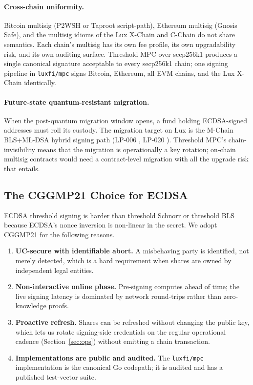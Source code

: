 \paragraph{Cross-chain uniformity.} Bitcoin multisig (P2WSH or
Taproot script-path), Ethereum multisig (Gnosis Safe), and the
multisig idioms of the Lux X-Chain and C-Chain do not share semantics.
Each chain's multisig has its own fee profile, its own upgradability
risk, and its own auditing surface. Threshold MPC over secp256k1
produces a single canonical signature acceptable to every secp256k1
chain; one signing pipeline in \texttt{luxfi/mpc} signs Bitcoin,
Ethereum, all EVM chains, and the Lux X-Chain identically.

\paragraph{Future-state quantum-resistant migration.} When the
post-quantum migration window opens, a fund holding ECDSA-signed
addresses must roll its custody. The migration target on Lux is the
M-Chain BLS+ML-DSA hybrid signing path (LP-006 \cite{lp006},
LP-020 \cite{lp020}). Threshold MPC's chain-invisibility means that
the migration is operationally a key rotation; on-chain multisig
contracts would need a contract-level migration with all the upgrade
risk that entails.

\subsection{The CGGMP21 Choice for ECDSA}

ECDSA threshold signing is harder than threshold Schnorr or
threshold BLS because ECDSA's nonce inversion is non-linear in the
secret. We adopt CGGMP21 \cite{cggmp21} for the following reasons.

\begin{enumerate}[nosep]
\item \textbf{UC-secure with identifiable abort.} A misbehaving
party is identified, not merely detected, which is a hard requirement
when shares are owned by independent legal entities.
\item \textbf{Non-interactive online phase.} Pre-signing computes
ahead of time; the live signing latency is dominated by network
round-trips rather than zero-knowledge proofs.
\item \textbf{Proactive refresh.} Shares can be refreshed without
changing the public key, which lets us rotate signing-side credentials
on the regular operational cadence (Section~\ref{sec:ops}) without
emitting a chain transaction.
\item \textbf{Implementations are public and audited.} The
\texttt{luxfi/mpc} implementation is the canonical Go codepath; it
is audited and has a published test-vector suite.
\end{enumerate}

